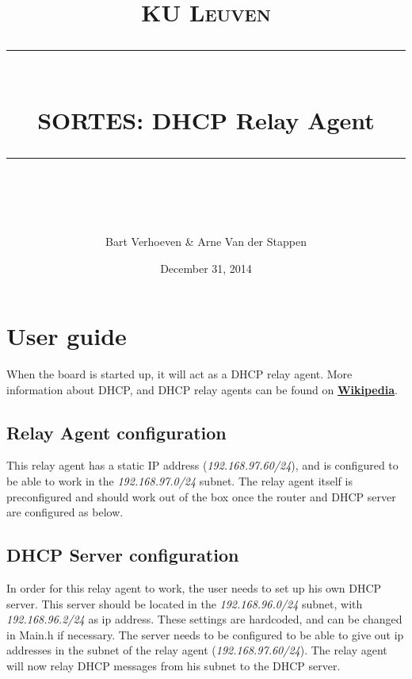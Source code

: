 \documentclass[11pt,a4paper]{scrartcl}
\begin{document}
\lstset{language=Prolog,basicstyle=\footnotesize}
\renewcommand\lstlistingname{Code}
\DeclarePairedDelimiter{\ceil}{\lceil}{\rceil}

\newcommand{\horrule}[1]{\rule{\linewidth}{#1}} %

\title{
\normalfont \normalsize
\textsc{KU Leuven} \\ [25pt] %
\horrule{0.5pt} \\[0.4cm] %
\huge SORTES: DHCP Relay Agent \\ %
\horrule{2pt} \\[0.5cm] %
}
 
\author{Bart Verhoeven \& Arne Van der Stappen} %
 
\date{\normalsize December 31, 2014} %
 
\maketitle %

\tableofcontents

\newpage

\section{User guide \label{sec:userguide}}
When the board is started up, it will act as a DHCP relay agent. More information about DHCP, and DHCP relay agents can be found on \href{http://en.wikipedia.org/wiki/Dynamic_Host_Configuration_Protocol} {\textbf{Wikipedia}}.

\subsection{Relay Agent configuration}
This relay agent has a static IP address (\textit{192.168.97.60/24}), and is configured to be able to work in the \textit{192.168.97.0/24} subnet. The relay agent itself is preconfigured and should work out of the box once the router and DHCP server are configured as below.

\subsection{DHCP Server configuration}
In order for this relay agent to work, the user needs to set up his own DHCP server. This server should be located in the \textit{192.168.96.0/24} subnet, with \textit{192.168.96.2/24} as ip address. These settings are hardcoded, and can be changed in Main.h if necessary. The server needs to be configured to be able to give out ip addresses in the subnet of the relay agent (\textit{192.168.97.60/24}). The relay agent will now relay DHCP messages from his subnet to the DHCP server.
\end{document}
